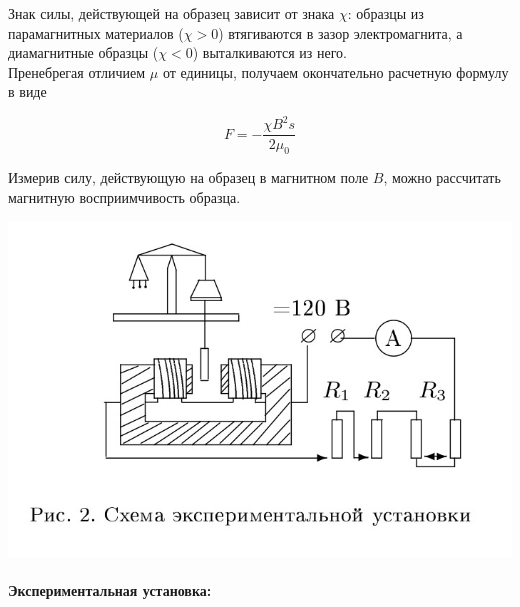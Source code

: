 \documentclass[a4paper, 12pt]{article}
\newcommand{\parag}[1]{\paragraph*{#1:}}
\begin{document}
Знак силы, действующей на образец зависит от знака $\chi$: образцы из парамагнитных материалов ($\chi > 0$) втягиваются в зазор электромагнита, а диамагнитные образцы ($\chi < 0$) выталкиваются из него.
\\

Пренебрегая отличием $\mu$ от единицы, получаем окончательно расчетную формулу в виде

\begin{equation}
    F = - \dfrac{\chi B^2 s}{2 \mu_0}
\end{equation}

Измерив силу, действующую на образец в магнитном поле $B$, можно рассчитать магнитную восприимчивость образца.

\begin{center}
    \includegraphics[scale=0.4]{pic2.jpg}    
\end{center}

\parag{Экспериментальная установка}
\end{document}

